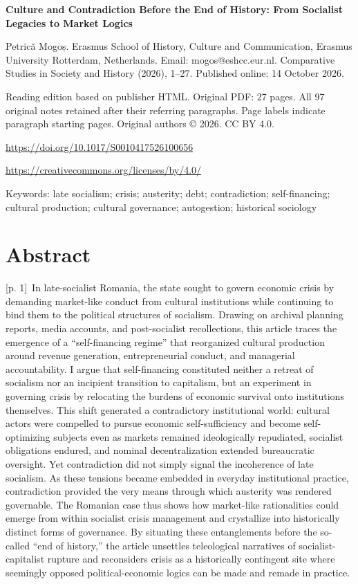 \documentclass[10pt,a4paper]{article}
\begin{document}
{\Large\bfseries Culture and Contradiction Before the End of History: From Socialist Legacies to Market Logics\par}\medskip

Petrică Mogoș. Erasmus School of History, Culture and Communication, Erasmus University Rotterdam, Netherlands. Email: mogos@eshcc.eur.nl. Comparative Studies in Society and History (2026), 1–27. Published online: 14 October 2026.\par
Reading edition based on publisher HTML. Original PDF: 27 pages. All 97 original notes retained after their referring paragraphs. Page labels indicate paragraph starting pages. Original authors © 2026. CC BY 4.0.\par
\url{https://doi.org/10.1017/S0010417526100656}\par
\url{https://creativecommons.org/licenses/by/4.0/}\par
Keywords: late socialism; crisis; austerity; debt; contradiction; self-financing; cultural production; cultural governance; autogestion; historical sociology\par\bigskip
{}\section*{Abstract}
{\scriptsize\color{gray} [p. 1]}\ In late-socialist Romania, the state sought to govern economic crisis by demanding market-like conduct from cultural institutions while continuing to bind them to the political structures of socialism. Drawing on archival planning reports, media accounts, and post-socialist recollections, this article traces the emergence of a “self-financing regime” that reorganized cultural production around revenue generation, entrepreneurial conduct, and managerial accountability. I argue that self-financing constituted neither a retreat of socialism nor an incipient transition to capitalism, but an experiment in governing crisis by relocating the burdens of economic survival onto institutions themselves. This shift generated a contradictory institutional world: cultural actors were compelled to pursue economic self-sufficiency and become self-optimizing subjects even as markets remained ideologically repudiated, socialist obligations endured, and nominal decentralization extended bureaucratic oversight. Yet contradiction did not simply signal the incoherence of late socialism. As these tensions became embedded in everyday institutional practice, contradiction provided the very means through which austerity was rendered governable. The Romanian case thus shows how market-like rationalities could emerge from within socialist crisis management and crystallize into historically distinct forms of governance. By situating these entanglements before the so-called “end of history,” the article unsettles teleological narratives of socialist-capitalist rupture and reconsiders crisis as a historically contingent site where seemingly opposed political-economic logics can be made and remade in practice.\par
\end{document}

